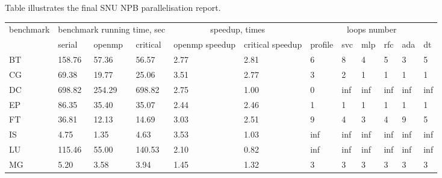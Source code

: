 \documentclass[sigconf,10pt,review,anonymous]{acmart}
\begin{document}
\quad Table illustrates the final SNU NPB parallelisation report.

\begin{table}[h!]
    \centering
    \begin{tabular}[c]{|p{1cm}|p{1cm}|p{1cm}|p{1cm}|p{1cm}|p{1cm}|p{1cm}|p{1cm}|p{1cm}|p{1cm}|p{1cm}|p{1cm}|}
        \hline
        \multirow{2}{2.5cm}{benchmark} & \multicolumn{3}{c}{benchmark running time, sec} \vline & \multicolumn{2}{c}{speedup, times} \vline & \multicolumn{6}{c}{loops number} \vline\\\cline{2-12}
        & serial & openmp & critical & openmp speedup & critical speedup & profile & svc & mlp & rfc & ada & dt\\\cline{1-12}
        \hline
        BT & 158.76 & 57.36 & 56.57 & 2.77 & 2.81 & 6 & \cellcolor[HTML]{FA8D8D} 8 & \cellcolor[HTML]{7BB66B} 4 & \cellcolor[HTML]{7BB66B} 5 & \cellcolor[HTML]{7BB66B} 3 & \cellcolor[HTML]{7BB66B} 5\\
        \hline
        CG & 69.38 & 19.77 & 25.06 & 3.51 & 2.77 & 3 & \cellcolor[HTML]{7BB66B} 2 & \cellcolor[HTML]{7BB66B} 1 & \cellcolor[HTML]{7BB66B} 1 & \cellcolor[HTML]{7BB66B} 1 & \cellcolor[HTML]{7BB66B} 1\\
        \hline
        DC & 698.82 & 254.29 & 698.82 & 2.75 & 1.00 & 0 & \cellcolor[HTML]{91A1FA} inf & \cellcolor[HTML]{91A1FA} inf & \cellcolor[HTML]{91A1FA} inf & \cellcolor[HTML]{91A1FA} inf & \cellcolor[HTML]{91A1FA} inf\\
        \hline
        EP & 86.35 & 35.40 & 35.07 & 2.44 & 2.46 & 1 & \cellcolor[HTML]{91A1FA} 1 & \cellcolor[HTML]{91A1FA} 1 & \cellcolor[HTML]{91A1FA} 1 & \cellcolor[HTML]{91A1FA} 1 & \cellcolor[HTML]{91A1FA} 1\\
        \hline
        FT & 36.81 & 12.13 & 14.69 & 3.03 & 2.51 & 9 & \cellcolor[HTML]{7BB66B} 4 & \cellcolor[HTML]{7BB66B} 3 & \cellcolor[HTML]{7BB66B} 4 & \cellcolor[HTML]{91A1FA} 9 & \cellcolor[HTML]{7BB66B} 5\\
        \hline
        IS & 4.75 & 1.35 & 4.63 & 3.53 & 1.03 & inf & \cellcolor[HTML]{91A1FA} inf & \cellcolor[HTML]{91A1FA} inf & \cellcolor[HTML]{91A1FA} inf & \cellcolor[HTML]{91A1FA} inf & \cellcolor[HTML]{91A1FA} inf\\
        \hline
        LU & 115.46 & 55.00 & 140.53 & 2.10 & 0.82 & inf & \cellcolor[HTML]{91A1FA} inf & \cellcolor[HTML]{91A1FA} inf & \cellcolor[HTML]{91A1FA} inf & \cellcolor[HTML]{91A1FA} inf & \cellcolor[HTML]{91A1FA} inf\\
        \hline
        MG & 5.20 & 3.58 & 3.94 & 1.45 & 1.32 & 3 & \cellcolor[HTML]{91A1FA} 3 & \cellcolor[HTML]{91A1FA} 3 & \cellcolor[HTML]{91A1FA} 3 & \cellcolor[HTML]{91A1FA} 3 & \cellcolor[HTML]{91A1FA} 3\\

\end{tabular}
\end{table}
\end{document}
